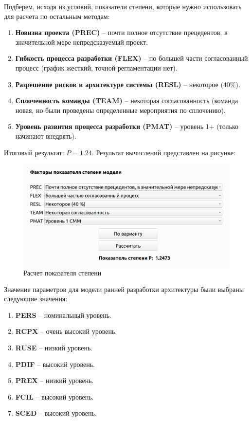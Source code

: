 Подберем, исходя из условий, показатели степени, которые нужно использовать для расчета по остальным методам:
\begin{enumerate}
	\item \textbf{Новизна проекта (PREC)} -- почти полное отсутствие прецедентов, в значительной мере непредсказуемый проект.
	\item \textbf{Гибкость процесса разработки (FLEX)} -- по большей части согласованный процесс (график жесткий, точной регламентации нет).
	\item \textbf{Разрешение рисков в архитектуре системы (RESL)} -- некоторое (40\%).
	\item \textbf{Сплоченность команды (TEAM)} -- некоторая согласованность (команда новая, но были проведены определенные мероприятия по сплочению).
	\item \textbf{Уровень развития процесса разработки (PMAT) } -- уровень 1+ (только начинают внедрять).
\end{enumerate}

Итоговый результат: $P = 1.24$.
Результат вычислений представлен на рисунке:
\FloatBarrier
\begin{figure}[h]	
	\begin{center}
		\includegraphics[width=\linewidth]{inc/coef.png}
	\end{center}
	\captionsetup{justification=centering}
	\caption{Расчет показателя степени}
\end{figure}
\FloatBarrier 

Значение параметров для модели ранней разработки архитектуры были выбраны следующие значения:
\begin{enumerate}
	\item \textbf{PERS} -- номинальный уровень.
	\item \textbf{RCPX} -- очень высокий уровень.
	\item \textbf{RUSE} -- низкий уровень.
	\item \textbf{PDIF} -- высокий уровень.
	\item \textbf{PREX} -- низкий уровень.
	\item \textbf{FCIL} -- высокий уровень.
	\item \textbf{SCED} -- высокий уровень.
\end{enumerate}


